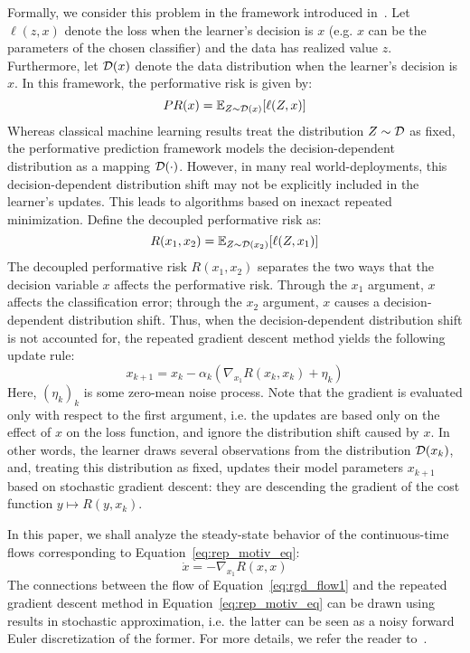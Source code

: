 Formally, we consider this problem in the framework introduced in~\citet{Perdomo:2020tz}. Let $\ell(z,x)$ denote the loss when the learner's decision is $x$ (e.g. $x$ can be the parameters of the chosen classifier) and the data has realized value $z$. Furthermore, let $\mathcal{D}(x)$ denote the data distribution when the learner's decision is $x$. In this framework, the performative risk is given by:
\begin{equation}
\label{eq:perf_risk}
PR(x) = \mathbb{E}_{Z \sim \mathcal{D}(x)} [\ell(Z,x)]
\end{equation}
Whereas classical machine learning results treat the distribution $Z \sim \mathcal{D}$ as fixed, the performative prediction framework models the decision-dependent distribution as a mapping $\mathcal{D}(\cdot)$. However, in many real world-deployments, this decision-dependent distribution shift may not be explicitly included in the learner's updates. This leads to algorithms based on inexact repeated minimization. Define the decoupled performative risk as:
\begin{equation}
\label{eq:decoupled_perf_risk}
R(x_1,x_2) = \mathbb{E}_{Z \sim \mathcal{D}(x_2)} [\ell(Z,x_1)]
\end{equation}
The decoupled performative risk $R(x_1,x_2)$ separates the two ways that the decision variable $x$ affects the performative risk. Through the $x_1$ argument, $x$ affects the classification error; through the $x_2$ argument, $x$ causes a decision-dependent distribution shift. 
Thus, when the decision-dependent distribution shift is not accounted for, the repeated gradient descent method yields the following update rule:
\begin{equation}
\label{eq:rep_motiv_eq}
x_{k+1} = x_k - \alpha_k (\nabla_{x_1} R(x_k,x_k) + \eta_k)
\end{equation}
Here, $(\eta_k)_k$ is some zero-mean noise process. 
Note that the gradient is evaluated only with respect to the first argument, i.e. the updates are based only on the effect of $x$ on the loss function, and ignore the distribution shift caused by $x$. In other words, the learner draws several observations from the distribution $\mathcal{D}(x_k)$, and, treating this distribution as fixed, updates their model parameters $x_{k+1}$ based on stochastic gradient descent: they are descending the gradient of the cost function $y \mapsto R(y,x_k)$.

In this paper, we shall analyze the steady-state behavior of the continuous-time flows corresponding to Equation~\eqref{eq:rep_motiv_eq}:
\begin{equation}
\label{eq:rgd_flow1}
\dot x = - \nabla_{x_1}R(x,x)
\end{equation}
The connections between the flow of Equation~\eqref{eq:rgd_flow1} and the repeated gradient descent method in Equation~\eqref{eq:rep_motiv_eq} can be drawn using results in stochastic approximation, i.e. the latter can be seen as a noisy forward Euler discretization of the former. For more details, we refer the reader to~\citet{Borkar:2008ts}.

